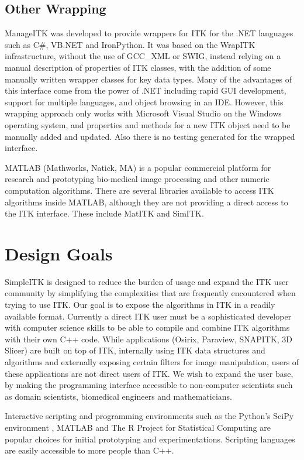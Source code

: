 \documentclass{frontiersMED} %
\begin{document}
\subsection{Other Wrapping}
ManageITK was developed \cite{Mueller2007} to provide
wrappers for ITK for the .NET languages such as C\#, VB.NET and
IronPython. It was based on the WrapITK infrastructure, without the
use of GCC\_XML or SWIG, instead relying on a manual description of
properties of ITK classes, with the addition of some manually written
wrapper classes for key data types. Many of the advantages of this
interface come from the power of .NET including rapid GUI development,
support for multiple languages, and object browsing in an
IDE. However, this wrapping approach only works with Microsoft Visual
Studio on the Windows operating system, and properties and methods for
a new ITK object need to be manually added and updated.  Also there is
no testing generated for the wrapped interface.

MATLAB  (Mathworks, Natick, MA) is a popular commercial platform for research and
prototyping bio-medical image processing and other numeric computation
algorithms. There are several libraries available to access ITK
algorithms inside MATLAB, although they are not providing a direct
access to the ITK interface. These include MatITK\cite{Chu2006} and
SimITK\cite{Dickinson2011}.

\section{Design Goals}

SimpleITK is designed to reduce the burden of usage and expand the ITK
user community by simplifying the complexities that are frequently
encountered when trying to use ITK. Our goal is to expose the
algorithms in ITK in a readily available format. Currently a direct
ITK user must be a sophisticated developer with computer science
skills to be able to compile and combine ITK algorithms with their own
C++ code. While applications (Osirix, Paraview, SNAPITK, 3D Slicer)
are built on top of ITK, internally using ITK data structures and
algorithms and externally exposing certain filters for image
manipulation, users of these applications are not direct users of
ITK. We wish to expand the user base, by making the programming
interface accessible to non-computer scientists such as domain
scientists, biomedical engineers and mathematicians.

Interactive scripting and programming environments such as the
Python's SciPy environment \cite{Jones2001}, MATLAB
and The R Project for Statistical Computing are popular choices for
initial prototyping and experimentations. Scripting languages are
easily accessible to more people than C++.
\end{document}
